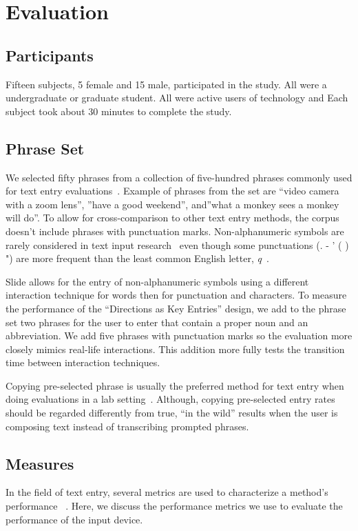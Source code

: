 \section{Evaluation}

\subsection{Participants}
Fifteen subjects, 5 female and 15 male, participated in the study.
All were a undergraduate or graduate student.
All were active users of technology and 
Each subject took about 30 minutes to complete the study.

\subsection{Phrase Set}
We selected fifty phrases from a collection of five-hundred phrases commonly used for text entry evaluations~\cite{mackenzie2003phrase}.
Example of phrases from the set are ``video camera with a zoom lens'', ''have a good weekend'', and''what a monkey sees a monkey will do''.
To allow for cross-comparison to other text entry methods, the corpus doesn't include phrases with punctuation marks.
Non-alphanumeric symbols are rarely considered in text input research~\cite{mackenzie2003phrase} even though some punctuations (. - ' ( ) ") are more frequent than the least common English letter,  \textit{q}~\cite{malikpunctuation}.
 
Slide allows for the entry of non-alphanumeric symbols using a different interaction technique for words then for punctuation and characters.
To measure the performance of the ``Directions as Key Entries'' design, we add to the phrase set two phrases for the user to enter that contain a proper noun and an abbreviation.
We add five phrases with punctuation marks so the evaluation more closely mimics real-life interactions.
This addition more fully tests the transition time between interaction techniques. 

Copying pre-selected phrase is usually the preferred method for text entry when doing evaluations in a lab setting~\cite{mackenzie2002character, mackenzie2003phrase}.
Although, copying pre-selected entry rates should be regarded differently from true, ``in the wild'' results when the user is composing text instead of transcribing prompted phrases.


\subsection{Measures}
In the field of text entry, several metrics are used to characterize a method's performance ~\cite{wobbrock2007measures,arif2009analysis}.
Here, we discuss the performance metrics we use to evaluate the performance of the input device.  


